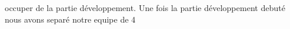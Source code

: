 \documentclass[a4paper, 11pt, french]{report}
\begin{document}
                                                                                                                                 occuper
                                                                                                                                 de
                                                                                                                                 la
                                                                                                                                 partie
                                                                                                                                 développement.
                                                                                                                                  \newline
                                                                                                                                   Une
                                                                                                                                   fois
                                                                                                                                   la
                                                                                                                                   partie
                                                                                                                                   développement
                                                                                                                                   debuté
                                                                                                                                   nous
                                                                                                                                   avons
                                                                                                                                   separé
                                                                                                                                   notre
                                                                                                                                   equipe
                                                                                                                                   de
                                                                                                                                   4
\end{document}
